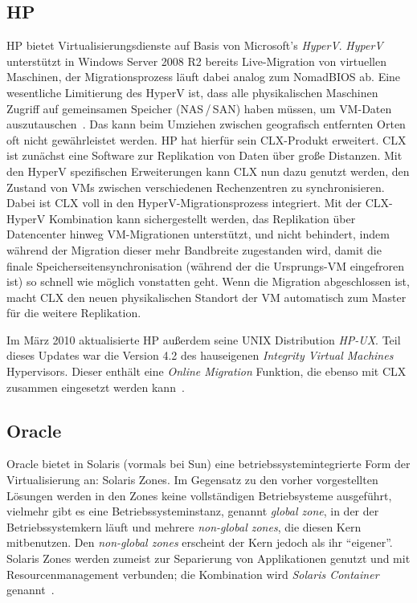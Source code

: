 \subsection{HP}
HP bietet Virtualisierungsdienste auf Basis von Microsoft's
\emph{HyperV}. \emph{HyperV} unterstützt in Windows Server 2008 R2
bereits Live-Migration von virtuellen Maschinen, der Migrationsprozess
läuft dabei analog zum NomadBIOS ab. Eine wesentliche Limitierung des
HyperV ist, dass alle physikalischen Maschinen Zugriff auf gemeinsamen
Speicher (\ac{NAS}\,/\,\ac{SAN}) haben müssen, um \ac{VM}-Daten
auszutauschen~\cite{hp2010hyperV}. Das kann beim Umziehen zwischen
geografisch entfernten Orten oft nicht gewährleistet werden. HP hat
hierfür sein \ac{CLX}-Produkt erweitert. \ac{CLX} ist zunächst eine
Software zur Replikation von Daten über große Distanzen. Mit den
HyperV spezifischen Erweiterungen kann \ac{CLX} nun dazu genutzt
werden, den Zustand von \acp{VM} zwischen verschiedenen Rechenzentren
zu synchronisieren. Dabei ist \ac{CLX} voll in den
HyperV-Migrationsprozess integriert. Mit der \ac{CLX}-HyperV
Kombination kann sichergestellt werden, das Replikation über
Datencenter hinweg \ac{VM}-Migrationen unterstützt, und nicht
behindert, indem während der Migration dieser mehr Bandbreite
zugestanden wird, damit die finale Speicherseitensynchronisation
(während der die Ursprungs-\ac{VM} eingefroren ist) so schnell wie
möglich vonstatten geht. Wenn die Migration abgeschlossen ist, macht
\ac{CLX} den neuen physikalischen Standort der \ac{VM} automatisch zum
Master für die weitere Replikation.

Im März 2010 aktualisierte HP außerdem seine UNIX Distribution
\emph{HP-UX}. Teil dieses Updates war die Version 4.2 des hauseigenen
\emph{Integrity Virtual Machines} Hypervisors. Dieser enthält eine
\emph{Online Migration} Funktion, die ebenso mit \ac{CLX} zusammen
eingesetzt werden kann~\cite{hp2010integrity}.

\subsection{Oracle}

Oracle bietet in Solaris (vormals bei Sun) eine betriebssystemintegrierte
Form der Virtualisierung an: Solaris Zones. Im Gegensatz zu den vorher
vorgestellten Lösungen werden in den Zones keine vollständigen
Betriebsysteme ausgeführt, vielmehr gibt es eine
Betriebssysteminstanz, genannt \emph{global zone}, in der der
Betriebssystemkern läuft und mehrere \emph{non-global zones}, die
diesen Kern mitbenutzen. Den \emph{non-global zones} erscheint der
Kern jedoch als ihr "`eigener"'. Solaris Zones werden zumeist zur
Separierung von Applikationen genutzt und mit Resourcenmanagement
verbunden; die Kombination wird \emph{Solaris Container}
genannt~\cite{price2004solaris}.

